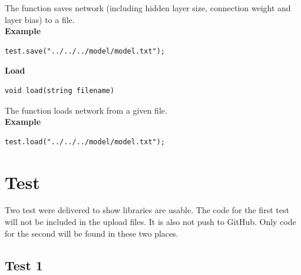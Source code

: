 \documentclass[letterpaper]{article}
\begin{document}
The function saves network (including hidden layer size, connection weight and layer bias) to a file.\\
\textbf{Example}
\begin{lstlisting}[language={[ANSI]C++},keywordstyle=\color{blue!70},commentstyle=\color{red!50!green!50!blue!50},frame=shadowbox, rulesepcolor=\color{red!20!green!20!blue!20}]
test.save("../../../model/model.txt");
\end{lstlisting}
\textbf{\Large Load}
\begin{lstlisting}[language={[ANSI]C++},keywordstyle=\color{blue!70},commentstyle=\color{red!50!green!50!blue!50},frame=shadowbox, rulesepcolor=\color{red!20!green!20!blue!20}]
void load(string filename)
\end{lstlisting}

The function loads network from a given file.\\
\textbf{Example}
\begin{lstlisting}[language={[ANSI]C++},keywordstyle=\color{blue!70},commentstyle=\color{red!50!green!50!blue!50},frame=shadowbox, rulesepcolor=\color{red!20!green!20!blue!20}]
test.load("../../../model/model.txt");
\end{lstlisting}
\section{Test}
Two test were delivered to show libraries are usable. The code for the first test will not be included in the upload files. It is also not push to GitHub. Only code for the second will be found in these two places. 
\subsection{Test 1}
\end{document}

